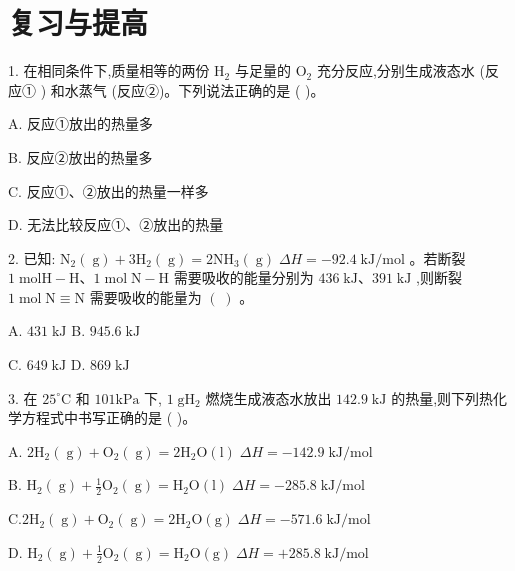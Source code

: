 \documentclass[10pt]{article}
\begin{document}
\section*{复习与提高}

1. 在相同条件下,质量相等的两份 \({\mathrm{H}}_{2}\) 与足量的 \({\mathrm{O}}_{2}\) 充分反应,分别生成液态水 (反应① ) 和水蒸气 (反应②)。下列说法正确的是 ( )。

A. 反应①放出的热量多

B. 反应②放出的热量多

C. 反应①、②放出的热量一样多

D. 无法比较反应①、②放出的热量

2. 已知: \({\mathrm{N}}_{2}\left( \mathrm{\;g}\right) + 3{\mathrm{H}}_{2}\left( \mathrm{\;g}\right) = 2{\mathrm{{NH}}}_{3}\left( \mathrm{\;g}\right) \;{\Delta H} = - {92.4}\mathrm{\;{kJ}}/\mathrm{{mol}}\) 。若断裂 \(1\mathrm{\;{mol}}\mathrm{H} - \mathrm{H}\text{、}1\mathrm{\;{mol}}\mathrm{\;N} - \mathrm{H}\) 需要吸收的能量分别为 \({436}\mathrm{\;{kJ}}\text{、}{391}\mathrm{\;{kJ}}\) ,则断裂 \(1\mathrm{\;{mol}}\mathrm{\;N} \equiv \mathrm{N}\) 需要吸收的能量为 \(\left( \;\right)\) 。

A. \({431}\mathrm{\;{kJ}}\) B. \({945.6}\mathrm{\;{kJ}}\)

C. \({649}\mathrm{\;{kJ}}\) D. \({869}\mathrm{\;{kJ}}\)

3. 在 \({25}^{ \circ }\mathrm{C}\) 和 \({101}\mathrm{{kPa}}\) 下, \(1\mathrm{\;g}{\mathrm{H}}_{2}\) 燃烧生成液态水放出 \({142.9}\mathrm{\;{kJ}}\) 的热量,则下列热化学方程式中书写正确的是 ( )。

A. \(2{\mathrm{H}}_{2}\left( \mathrm{\;g}\right) + {\mathrm{O}}_{2}\left( \mathrm{\;g}\right) = 2{\mathrm{H}}_{2}\mathrm{O}\left( \mathrm{l}\right) \;{\Delta H} = - {142.9}\mathrm{\;{kJ}}/\mathrm{{mol}}\)

B. \({\mathrm{H}}_{2}\left( \mathrm{\;g}\right) + \frac{1}{2}{\mathrm{O}}_{2}\left( \mathrm{\;g}\right) = {\mathrm{H}}_{2}\mathrm{O}\left( \mathrm{l}\right) \;{\Delta H} = - {285.8}\mathrm{\;{kJ}}/\mathrm{{mol}}\)

\(\mathrm{C}.2{\mathrm{H}}_{2}\left( \mathrm{\;g}\right) + {\mathrm{O}}_{2}\left( \mathrm{\;g}\right) = 2{\mathrm{H}}_{2}\mathrm{O}\left( \mathrm{g}\right) \;{\Delta H} = - {571.6}\mathrm{\;{kJ}}/\mathrm{{mol}}\)

D. \({\mathrm{H}}_{2}\left( \mathrm{\;g}\right) + \frac{1}{2}{\mathrm{O}}_{2}\left( \mathrm{\;g}\right) = {\mathrm{H}}_{2}\mathrm{O}\left( \mathrm{g}\right) \;{\Delta H} = + {285.8}\mathrm{\;{kJ}}/\mathrm{{mol}}\)
\end{document}
